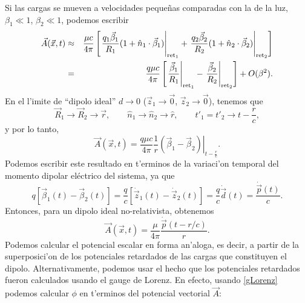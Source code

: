 Si las cargas se mueven a velocidades pequeñas comparadas con la de la luz, $\beta_1\ll 1$, $\beta_2\ll 1$, podemos escribir
\begin{eqnarray}
\vec{A}(\vec{x},t)&\approx&\frac{\mu c}{4\pi}\left[\left.\frac{q_1\vec{\beta}_1}{R_1}(1+\hat{n}_1\cdot\vec{\beta}_1)\right|_{{\rm ret}_1} +\left.\frac{q_2\vec{\beta}_2}{R_2}(1+\hat{n}_2\cdot\vec{\beta}_2)\right|_{{\rm ret}_2}\right] \\
&=&\frac{q\mu c}{4\pi}\left[\left.\frac{\vec{\beta}_1}{R_1}\right|_{{\rm ret}_1} -\left.\frac{\vec{\beta}_2}{R_2}\right|_{{\rm ret}_2}\right] +O(\beta^2).
\end{eqnarray}
En el l'imite de ``dipolo ideal'' $d\to 0$ ($\vec{z}_1\to\vec{0}$, $\vec{z}_2\to\vec{0}$), tenemos que
\begin{equation}
 \vec{R}_1\to\vec{R}_2\to\vec{r}, \qquad \hat{n}_1\to\hat{n}_2\to\hat{r}, \qquad  t'_1=t'_2\to t-\frac{r}{c},
\end{equation}
y por lo tanto,
\begin{equation}
 \vec{A}(\vec{x},t)=\frac{q\mu c}{4\pi}\frac{1}{r}\left.(\vec{\beta}_1-\vec{\beta}_2)\right|_{t-\frac{r}{c}}.
\end{equation}
Podemos escribir este resultado en t'erminos de la variaci'on temporal del momento dipolar eléctrico del sistema, ya que
\begin{equation}
q\left[\vec{\beta}_1(t)-\vec{\beta}_2(t)\right]=\frac{q}{c}\left[\dot{\vec{z}}_1(t)-\dot{\vec{z}}_2(t)\right]=\frac{q}{c}\dot{\vec{d}}(t)=\frac{\dot{\vec{p}}(t)}{c}.
\end{equation}
Entonces, para un dipolo ideal no-relativista, obtenemos
\begin{equation}
\boxed{\vec{A}(\vec{x},t)=\frac{\mu}{4\pi}\frac{\dot{\vec{p}}(t-{r}/{c})}{r}.} \label{Adipid}
\end{equation}
Podemos calcular el potencial escalar en forma an'aloga, es decir, a partir de la superposici'on de los potenciales retardados de las cargas que constituyen el dipolo. Alternativamente, podemos usar el hecho que los potenciales retardados fueron calculados usando el gauge de Lorenz. En efecto, usando \eqref{gLorenz} podemos calcular $\phi$ en t'erminos del potencial vectorial $\vec{A}$:
